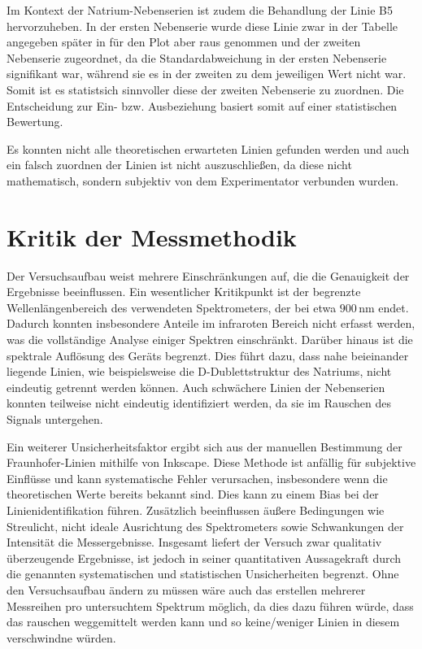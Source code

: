 Im Kontext der Natrium-Nebenserien ist zudem die Behandlung der Linie B5 hervorzuheben. In der ersten Nebenserie wurde diese Linie zwar in der Tabelle angegeben später in für den Plot aber raus genommen und der zweiten Nebenserie zugeordnet, da die Standardabweichung in der ersten Nebenserie signifikant war, während sie es in der zweiten zu dem jeweiligen Wert nicht war. Somit ist es statistsich sinnvoller diese der zweiten Nebenserie zu zuordnen. Die Entscheidung zur Ein- bzw. Ausbeziehung basiert somit auf einer statistischen Bewertung.

Es konnten nicht alle theoretischen erwarteten Linien gefunden werden und auch ein falsch zuordnen der Linien ist nicht auszuschließen, da diese nicht mathematisch, sondern subjektiv von dem Experimentator verbunden wurden.

\section{Kritik der Messmethodik}
\label{sec:Kritik}

Der Versuchsaufbau weist mehrere Einschränkungen auf, die die Genauigkeit der Ergebnisse beeinflussen. Ein wesentlicher Kritikpunkt ist der begrenzte Wellenlängenbereich des verwendeten Spektrometers, der bei etwa $900\,\mathrm{nm}$ endet. Dadurch konnten insbesondere Anteile im infraroten Bereich nicht erfasst werden, was die vollständige Analyse einiger Spektren einschränkt.
Darüber hinaus ist die spektrale Auflösung des Geräts begrenzt. Dies führt dazu, dass nahe beieinander liegende Linien, wie beispielsweise die D-Dublettstruktur des Natriums, nicht eindeutig getrennt werden können. Auch schwächere Linien der Nebenserien konnten teilweise nicht eindeutig identifiziert werden, da sie im Rauschen des Signals untergehen.

Ein weiterer Unsicherheitsfaktor ergibt sich aus der manuellen Bestimmung der Fraunhofer-Linien mithilfe von Inkscape. Diese Methode ist anfällig für subjektive Einflüsse und kann systematische Fehler verursachen, insbesondere wenn die theoretischen Werte bereits bekannt sind. Dies kann zu einem Bias bei der Linienidentifikation führen.
Zusätzlich beeinflussen äußere Bedingungen wie Streulicht, nicht ideale Ausrichtung des Spektrometers sowie Schwankungen der Intensität die Messergebnisse. Insgesamt liefert der Versuch zwar qualitativ überzeugende Ergebnisse, ist jedoch in seiner quantitativen Aussagekraft durch die genannten systematischen und statistischen Unsicherheiten begrenzt.
Ohne den Versuchsaufbau ändern zu müssen wäre auch das erstellen mehrerer Messreihen pro untersuchtem Spektrum möglich, da dies dazu führen würde, dass das rauschen weggemittelt werden kann und so keine/weniger Linien in diesem verschwindne würden.